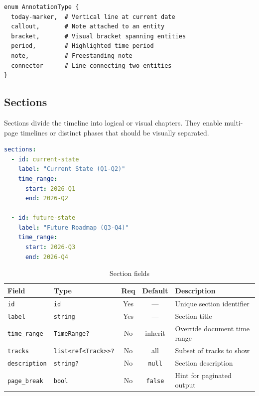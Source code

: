 \begin{lstlisting}
enum AnnotationType {
  today-marker,  # Vertical line at current date
  callout,       # Note attached to an entity
  bracket,       # Visual bracket spanning entities
  period,        # Highlighted time period
  note,          # Freestanding note
  connector      # Line connecting two entities
}
\end{lstlisting}


\subsection{Sections}
\label{sec:ir-sections}

Sections divide the timeline into logical or visual chapters. They enable multi-page
timelines or distinct phases that should be visually separated.

\begin{lstlisting}[language=yaml,caption={Section example}]
sections:
  - id: current-state
    label: "Current State (Q1-Q2)"
    time_range:
      start: 2026-Q1
      end: 2026-Q2

  - id: future-state
    label: "Future Roadmap (Q3-Q4)"
    time_range:
      start: 2026-Q3
      end: 2026-Q4
\end{lstlisting}

\begin{table}[h]
\centering
\small
\begin{tabular}{llccp{5cm}}
\toprule
\textbf{Field} & \textbf{Type} & \textbf{Req} & \textbf{Default} & \textbf{Description} \\
\midrule
\texttt{id} & \texttt{id} & Yes & --- & Unique section identifier \\
\texttt{label} & \texttt{string} & Yes & --- & Section title \\
\texttt{time\_range} & \texttt{TimeRange?} & No & inherit & Override document time range \\
\texttt{tracks} & \texttt{list<ref<Track>>?} & No & all & Subset of tracks to show \\
\texttt{description} & \texttt{string?} & No & \texttt{null} & Section description \\
\texttt{page\_break} & \texttt{bool} & No & \texttt{false} & Hint for paginated output \\
\bottomrule
\end{tabular}
\caption{Section fields}
\label{tab:section-fields}
\end{table}

